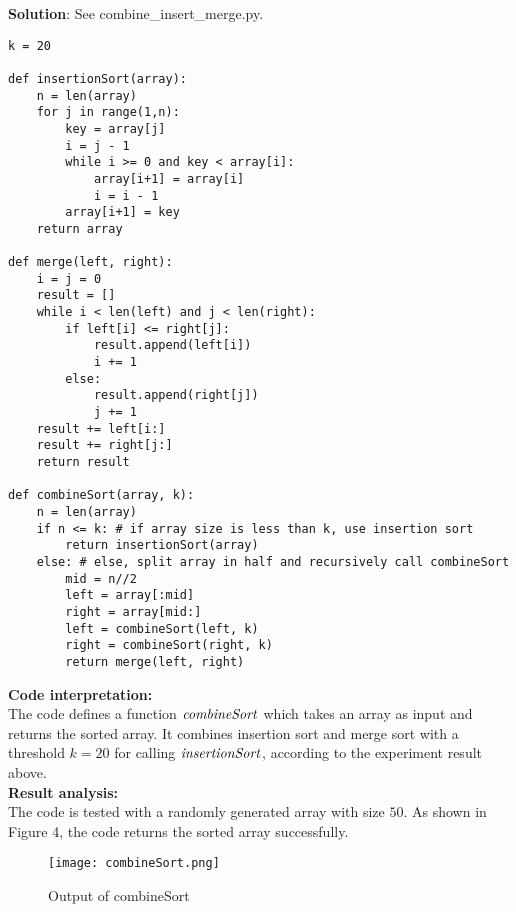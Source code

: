 \documentclass[UTF8]{ctexart}
\begin{document}
\textbf{Solution}: See combine\_insert\_merge.py.
\begin{lstlisting}
k = 20

def insertionSort(array):
    n = len(array)
    for j in range(1,n):
        key = array[j]
        i = j - 1
        while i >= 0 and key < array[i]:
            array[i+1] = array[i]
            i = i - 1
        array[i+1] = key
    return array

def merge(left, right):
    i = j = 0
    result = []
    while i < len(left) and j < len(right):
        if left[i] <= right[j]:
            result.append(left[i]) 
            i += 1
        else:
            result.append(right[j])
            j += 1
    result += left[i:]
    result += right[j:]
    return result
    
def combineSort(array, k):
    n = len(array)
    if n <= k: # if array size is less than k, use insertion sort
        return insertionSort(array)
    else: # else, split array in half and recursively call combineSort
        mid = n//2
        left = array[:mid]
        right = array[mid:]
        left = combineSort(left, k)
        right = combineSort(right, k)
        return merge(left, right)
\end{lstlisting}
\textbf{Code interpretation:} \\
The code defines a function $\it{combineSort}$ which takes an array as input and returns the sorted array. It combines insertion sort and merge sort with a threshold $k = 20$ for calling $\it{insertionSort}$, according to
the experiment result above.\\
\textbf{Result analysis:} \\
The code is tested with a randomly generated array with size $50$. As shown in Figure 4, the code returns the sorted array successfully.
\begin{figure}[H]
    \centering
    \texttt{[image: combineSort.png]}
    \caption{Output of combineSort}
\end{figure}
\end{document}

